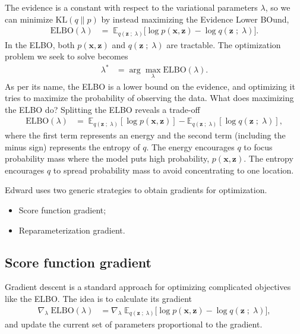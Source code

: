 The evidence is a constant with respect to the variational parameters
$\lambda$, so we can minimize $\text{KL}(q\|p)$ by instead maximizing
the Evidence Lower BOund,
\begin{align*}
  \text{ELBO}(\lambda)
  &=\;
  \mathbb{E}_{q(\mathbf{z}\;;\;\lambda)}
  \big[
  \log p(\mathbf{x}, \mathbf{z})
  -
  \log q(\mathbf{z}\;;\;\lambda)
  \big].
\end{align*}
In the ELBO, both $p(\mathbf{x}, \mathbf{z})$ and
$q(\mathbf{z}\;;\;\lambda)$ are tractable. The optimization problem we
seek to solve becomes
\begin{align*}
  \lambda^*
  &=
  \arg \max_\lambda \text{ELBO}(\lambda).
\end{align*}
As per its name, the ELBO is a lower bound on the evidence, and
optimizing it tries to maximize the probability of observing the data.
What does maximizing the ELBO do? Splitting the ELBO reveals a trade-off
\begin{align*}
  \text{ELBO}(\lambda)
  &=\;
  \mathbb{E}_{q(\mathbf{z} \;;\; \lambda)}[\log p(\mathbf{x}, \mathbf{z})]
  - \mathbb{E}_{q(\mathbf{z} \;;\; \lambda)}[\log q(\mathbf{z}\;;\;\lambda)],
\end{align*}
where the first term represents an energy and the second term
(including the minus sign) represents the entropy of $q$.
The energy encourages $q$ to focus probability mass where the
model puts high probability, $p(\mathbf{x}, \mathbf{z})$.
The entropy encourages $q$ to spread probability mass to avoid
concentrating to one location.

Edward uses two generic strategies to obtain gradients for
optimization.

\begin{itemize}
  \item Score function gradient;
  \item Reparameterization gradient.
\end{itemize}

\subsection{Score function gradient}

Gradient descent is a standard approach for optimizing complicated
objectives like the ELBO. The idea is to calculate its gradient
\begin{align*}
  \nabla_\lambda\;
  \text{ELBO}(\lambda)
  &=
  \nabla_\lambda\;
  \mathbb{E}_{q(\mathbf{z}\;;\;\lambda)}
  \big[
  \log p(\mathbf{x}, \mathbf{z})
  -
  \log q(\mathbf{z}\;;\;\lambda)
  \big],
\end{align*}
and update the current set of parameters proportional to the gradient.

